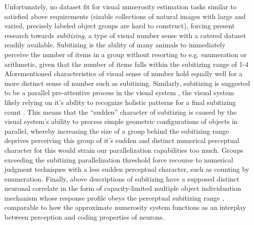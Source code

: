 \documentclass[twocolumn]{article}
\begin{document}
Unfortunately, no dataset fit for visual numerosity estimation tasks
similar to \citet{stoianov2012} satisfied above requirements (sizable
collections of natural images with large and varied, precisely labeled
object groups are hard to construct), forcing present research towards
\emph{subitizing}, a type of visual number sense with a catered
dataset readily available. Subitizing is the ability of many animals to
immediately perceive the number of items in a group without resorting to e.g. enumeration or arithmetic, given that the number of items falls within the
subitizing range of 1-4 \citep{kaufman1949, animalsnumericalcognition}
Aforementioned characteristics of visual sense of
number hold equally well for a more distinct sense of number such as
subitizing. Similarly, subitizing is suggested to be a parallel
pre-attentive process in the visual system
\citep[p.~57]{dehaene2011number}, the visual system likely relying on
it's ability to recognize holistic patterns for a final subitizing count
\citetext{\citealp{jansen2014role}; \citealp[p.~57]{dehaene2011number}; \citealp{piazza2002subitizing}}.
This means that the ``sudden'' character of subitizing is caused by the
visual system's ability to process simple geometric configurations of
objects in parallel, whereby increasing the size of a group behind the
subitizing range deprives perceiving this group of it's sudden and
distinct numerical perceptual character for this would strain our
parallelization capabilities too much. Groups exceeding the subitizing parallelization threshold force recourse to numerical judgment techniques with a less sudden perceptual character, such as counting by enumeration. Finally, above descriptions of subitizing have a supposed distinct neuronal correlate in the form of capacity-limited multiple object individuation mechanism whose response profile obeys the perceptual subitizing range \citep{poncet2016individuation}, comparable to how the approximate numerosity system functions as an interplay between perception and coding properties of neurons.\\
\end{document}
